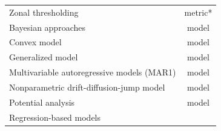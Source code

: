 \documentclass[12pt,twoside,openany]{reedthesis}
\begin{document}
\begin{longtable}[]{@{}lc@{}}
\begin{minipage}[t]{0.43\columnwidth}\raggedright
Zonal thresholding\strut
\end{minipage} & \begin{minipage}[t]{0.35\columnwidth}\centering
metric*\strut
\end{minipage}\tabularnewline
\begin{minipage}[t]{0.43\columnwidth}\raggedright
Bayesian approaches\strut
\end{minipage} & \begin{minipage}[t]{0.35\columnwidth}\centering
model\strut
\end{minipage}\tabularnewline
\begin{minipage}[t]{0.43\columnwidth}\raggedright
Convex model\strut
\end{minipage} & \begin{minipage}[t]{0.35\columnwidth}\centering
model\strut
\end{minipage}\tabularnewline
\begin{minipage}[t]{0.43\columnwidth}\raggedright
Generalized model\strut
\end{minipage} & \begin{minipage}[t]{0.35\columnwidth}\centering
model\strut
\end{minipage}\tabularnewline
\begin{minipage}[t]{0.43\columnwidth}\raggedright
Multivariable autoregressive
models (MAR1)\strut
\end{minipage} & \begin{minipage}[t]{0.35\columnwidth}\centering
model\strut
\end{minipage}\tabularnewline
\begin{minipage}[t]{0.43\columnwidth}\raggedright
Nonparametric
drift-diffusion-jump model\strut
\end{minipage} & \begin{minipage}[t]{0.35\columnwidth}\centering
model\strut
\end{minipage}\tabularnewline
\begin{minipage}[t]{0.43\columnwidth}\raggedright
Potential analysis\strut
\end{minipage} & \begin{minipage}[t]{0.35\columnwidth}\centering
model\strut
\end{minipage}\tabularnewline
\begin{minipage}[t]{0.43\columnwidth}\raggedright
Regression-based models\strut
\end{minipage} & \begin{minipage}[t]{0.35\columnwidth}\centering

\end{minipage}
\end{longtable}
\end{document}
